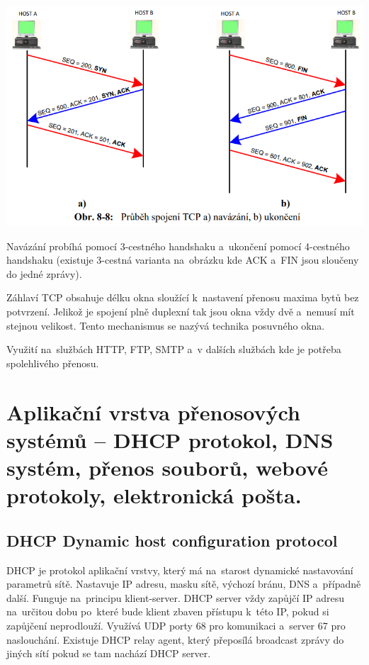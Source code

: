 \begin{center}
\includegraphics[scale = 0.5]{images/-052.png}
\end{center}

Navázání probíhá pomocí 3-cestného handshaku a~ukončení pomocí 4-cestného handshaku (existuje 3-cestná varianta na~obrázku kde ACK a~FIN jsou sloučeny do jedné zprávy).

Záhlaví TCP obsahuje délku okna sloužící k~nastavení přenosu maxima bytů bez potvrzení. Jelikož je spojení plně duplexní tak jsou okna vždy dvě a~nemusí mít stejnou velikost. Tento mechanismus se nazývá technika posuvného okna.

Využití na~službách HTTP, FTP, SMTP a~v dalších službách kde je potřeba spolehlivého přenosu.

\clearpage
\section{Aplikační vrstva přenosových systémů -- DHCP protokol, DNS systém, přenos souborů, webové protokoly, elektronická pošta.}

\subsection{DHCP Dynamic host configuration protocol}

DHCP je protokol aplikační vrstvy, který má na~starost dynamické nastavování parametrů sítě. Nastavuje IP adresu, masku sítě, výchozí bránu, DNS a~případně další. Funguje na~principu klient-server. DHCP server vždy zapůjčí IP adresu na~určitou dobu po~které bude klient zbaven přístupu k~této IP, pokud si zapůjčení neprodlouží. Využívá UDP porty 68 pro komunikaci a~server 67 pro naslouchání. Existuje DHCP relay agent, který přeposílá broadcast zprávy do jiných sítí pokud se tam nachází DHCP server.

